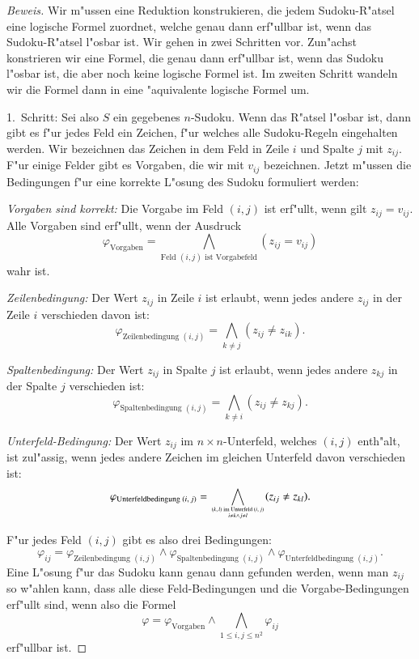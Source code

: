 \begin{proof}[Beweis]
Wir m"ussen eine Reduktion konstrukieren, die jedem Sudoku-R"atsel
eine logische Formel zuordnet, welche genau dann erf"ullbar ist, wenn
das Sudoku-R"atsel l"osbar ist. Wir gehen in zwei Schritten vor. 
Zun"achst konstrieren wir eine Formel, die genau dann erf"ullbar ist,
wenn das Sudoku l"osbar ist, die aber noch keine logische Formel ist.
Im zweiten Schritt wandeln wir die Formel dann in eine "aquivalente
logische Formel um.

1.~Schritt: Sei also $S$ ein gegebenes $n$-Sudoku. Wenn das R"atsel l"osbar
ist, dann gibt es f"ur jedes Feld ein Zeichen, f"ur welches alle Sudoku-Regeln
eingehalten werden. Wir bezeichnen das Zeichen in dem Feld in Zeile $i$
und Spalte $j$ mit $z_{ij}$. F"ur einige Felder gibt es Vorgaben, die wir mit
$v_{ij}$ bezeichnen. Jetzt m"ussen die Bedingungen f"ur eine korrekte
L"osung des Sudoku formuliert werden:
\begin{compactenum}
\item {\em Vorgaben sind korrekt:} Die Vorgabe im Feld $(i,j)$ ist erf"ullt,
wenn gilt $z_{ij}=v_{ij}$. Alle Vorgaben sind erf"ullt, wenn der Ausdruck
\[
\varphi_{\text{Vorgaben}}=\bigwedge_{\text{Feld $(i,j)$ ist Vorgabefeld}}(z_{ij}=v_{ij})
\]
wahr ist.
\item {\em Zeilenbedingung:} Der Wert $z_{ij}$ in Zeile $i$ ist erlaubt,
wenn jedes andere $z_{ij}$ in der Zeile $i$ verschieden davon ist:
\[
\varphi_{\text{Zeilenbedingung $(i,j)$}}
=
\bigwedge_{k\ne j}(z_{ij}\ne z_{ik}).
\]
\item {\em Spaltenbedingung:} Der Wert $z_{ij}$ in Spalte $j$ ist erlaubt,
wenn jedes andere $z_{kj}$ in der Spalte $j$ verschieden ist:
\[
\varphi_{\text{Spaltenbedingung $(i,j)$}}
=
\bigwedge_{k\ne i}(z_{ij}\ne z_{kj}).
\]
\item {\em Unterfeld-Bedingung:} Der Wert $z_{ij}$ im $n\times n$-Unterfeld,
welches $(i,j)$ enth"alt, ist zul"assig, wenn jedes andere Zeichen im gleichen
Unterfeld davon verschieden ist:
\[
\varphi_
{\text{Unterfeldbedingung $(i,j)$}}
=
\bigwedge_{\myatop{\text{$(k,l)$ im Unterfeld $(i,j)$}}{i\ne k\wedge j\ne l}}(z_{ij}\ne z_{kl}).
\]
\end{compactenum}
F"ur jedes Feld $(i,j)$ gibt es also drei Bedingungen:
\[
\varphi_{ij}=
\varphi_{\text{Zeilenbedingung $(i,j)$}}
\wedge
\varphi_{\text{Spaltenbedingung $(i,j)$}}
\wedge
\varphi_{\text{Unterfeldbedingung $(i,j)$}}.
\]
Eine L"osung f"ur das Sudoku kann genau dann gefunden werden, wenn man
$z_{ij}$ so w"ahlen kann, dass alle diese Feld-Bedingungen und die
Vorgabe-Bedingungen erf"ullt sind, wenn also die Formel
\begin{equation}
\varphi=
\varphi_{\text{Vorgaben}}\wedge
\bigwedge_{1\le i,j\le n^2}
\varphi_{ij}
\label{sudoku-formel}
\end{equation}
erf"ullbar ist.


\end{proof}
